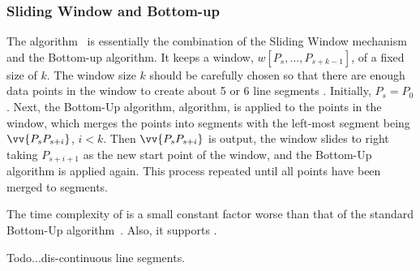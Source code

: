 {\begin{example}
\label{exm-alg-opw}
\end{example}


\subsubsection{Sliding Window and Bottom-up}

The \swab algorithm~\cite{Keogh:online} is essentially the combination of the Sliding Window mechanism and the Bottom-up algorithm.
It keeps a window, $w[P_s, \ldots, P_{s+k-1}]$, of a fixed size of $k$.
The window size $k$ should be carefully chosen so that there are enough data points in the window to create about 5 or 6 line segments \cite{Keogh:online}.
Initially, $P_s=P_0$.
Next, the Bottom-Up algorithm, \eg \pavlidis algorithm, is applied to the points in the window, which merges the points into segments with the left-most segment being $\vv{P_sP_{s+i}}$, $i<k$.
Then $\vv{P_sP_{s+i}}$ is output, the window slides to right taking $P_{s+i+1}$ as the new start point of the window, and the Bottom-Up algorithm is applied again.
This process repeated until all points have been merged to segments.

The time complexity of \swab is a small constant factor worse than that of the standard Bottom-Up algorithm~\cite{Keogh:online}.
Also, it supports \sed. %

\textcolor[rgb]{1.00,0.00,0.00}{Todo...dis-continuous line segments.}

} %

